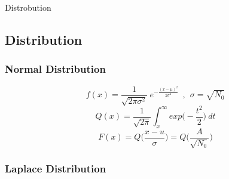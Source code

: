                 Distrobution

\subsection{Distribution}
\subsubsection{Normal Distribution}
\setlength{\abovedisplayshortskip}{7pt}
\setlength{\belowdisplayshortskip}{7pt}
\large$$ f(x) = \frac{1}{\sqrt{2\pi\sigma^2}} ~ e^{-\frac{(x-\mu)^2}{2\sigma^2}} ~~ , ~~ \sigma = \sqrt{N_0}$$
\normalsize
\setlength{\abovedisplayshortskip}{7pt}
\setlength{\belowdisplayshortskip}{7pt}
$$ Q(x) = \frac{1}{\sqrt{2\pi}}\int_x^\infty exp\big(-\frac{t^2}{2}\big)~dt$$
$$ F(x) = Q\big(\frac{x-u}{\sigma}\big) = Q \big(\frac{A}{\sqrt{N_0}}\big)$$


\subsubsection{Laplace Distribution}
